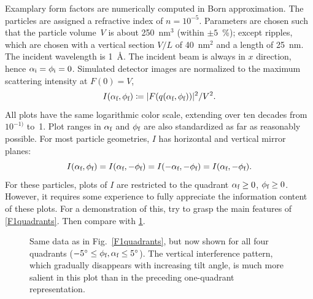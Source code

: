 Examplary form factors are numerically computed in Born approximation.
The particles are assigned a refractive index of $n=10^{-5}$.
Parameters are chosen such that
the particle volume~$V$ is about 250~nm$^3$ (within $\pm5$~\%);
except ripples, which are chosen with a vertical section $V/L$ of 40~nm$^2$
and a length of 25~nm.
The incident wavelength is 1~\AA.
The incident beam is always in $x$ direction, hence $\alpha_\si=\phi_\si=0$.
Simulated detector images are normalized to the maximum scattering intensity at $F(0)=V$,
\begin{equation}
  I(\alpha_\sf,\phi_\sf)\coloneqq |F(q(\alpha_\sf,\phi_\sf))|^2/V^2.
\end{equation}
All plots have the same logarithmic color scale,
extending over ten decades from $10^{-1)}$ to~1.
Plot ranges in $\alpha_\sf$ and $\phi_\sf$ are also standardized as far as
reasonably possible.
For most particle geometries,
$I$ has horizontal and vertical mirror planes:
\begin{equation}\label{EFq4sym}
  I(\alpha_\sf,\phi_\sf)
  = I(\alpha_\sf,-\phi_\sf)
  = I(-\alpha_\sf,-\phi_\sf)
  = I(\alpha_\sf,-\phi_\sf).
\end{equation}
For these particles,
plots of $I$ are restricted to the quadrant $\alpha_\sf\ge0$, $\phi_\sf\ge0$.
However, it requires some experience to fully appreciate the
information content of these plots.
For a demonstration of this,
try to grasp the main features of \cref{F1quadrants}.
Then compare with \cref{F4quadrants}.

\begin{figure}[t]
\begin{center}
\end{center}
\caption{Same data as in Fig.~\protect\ref{F1quadrants},
but now shown for all four quadrants ($-5^\circ\le\phi_\sf,\alpha_\sf\le 5^\circ$).
The vertical interference pattern,
which gradually disappears with increasing tilt angle,
 is much more salient in this plot
than in the preceding one-quadrant representation.}
\label{F4quadrants}
\end{figure}


 \label{SAnisoPyramid}

